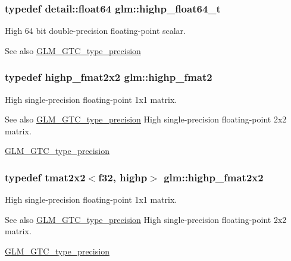 \subsubsection[{highp\+\_\+float64\+\_\+t}]{\setlength{\rightskip}{0pt plus 5cm}typedef detail\+::float64 {\bf glm\+::highp\+\_\+float64\+\_\+t}}\label{namespaceglm_ae8b3b2ace5be2a61c6bf63f12643fa15}
High 64 bit double-\/precision floating-\/point scalar. \begin{DoxySeeAlso}{See also}
\hyperlink{group__gtc__type__precision}{G\+L\+M\+\_\+\+G\+T\+C\+\_\+type\+\_\+precision} 
\end{DoxySeeAlso}
\hypertarget{namespaceglm_a10d47be18a81c111a8706d0a6df5b4ea}{}
\subsubsection[{highp\+\_\+fmat2}]{\setlength{\rightskip}{0pt plus 5cm}typedef {\bf highp\+\_\+fmat2x2} {\bf glm\+::highp\+\_\+fmat2}}\label{namespaceglm_a10d47be18a81c111a8706d0a6df5b4ea}
High single-\/precision floating-\/point 1x1 matrix. \begin{DoxySeeAlso}{See also}
\hyperlink{group__gtc__type__precision}{G\+L\+M\+\_\+\+G\+T\+C\+\_\+type\+\_\+precision} High single-\/precision floating-\/point 2x2 matrix. 

\hyperlink{group__gtc__type__precision}{G\+L\+M\+\_\+\+G\+T\+C\+\_\+type\+\_\+precision} 
\end{DoxySeeAlso}
\hypertarget{namespaceglm_a1497c01f2be9db9d69144537e00ff695}{}
\subsubsection[{highp\+\_\+fmat2x2}]{\setlength{\rightskip}{0pt plus 5cm}typedef tmat2x2$<${\bf f32}, highp$>$ {\bf glm\+::highp\+\_\+fmat2x2}}\label{namespaceglm_a1497c01f2be9db9d69144537e00ff695}
High single-\/precision floating-\/point 1x1 matrix. \begin{DoxySeeAlso}{See also}
\hyperlink{group__gtc__type__precision}{G\+L\+M\+\_\+\+G\+T\+C\+\_\+type\+\_\+precision} High single-\/precision floating-\/point 2x2 matrix. 

\hyperlink{group__gtc__type__precision}{G\+L\+M\+\_\+\+G\+T\+C\+\_\+type\+\_\+precision} 
\end{DoxySeeAlso}
\hypertarget{namespaceglm_a09c7950cd49474ac5c651d55e6d75195}{}
